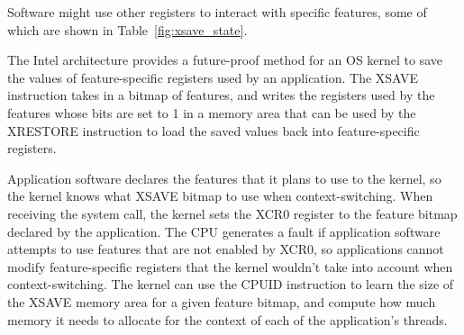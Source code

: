 Software might use other registers to interact with specific features, some of
which are shown in Table~\ref{fig:xsave_state}.

\begin{table}[hbt]
  \caption{Sample feature-specific Intel architecture registers.}
  \label{fig:xsave_state}
\end{table}

The Intel architecture provides a future-proof method for an OS kernel to save
the values of feature-specific registers used by an application. The XSAVE
instruction takes in a bitmap of features, and writes the registers used by
the features whose bits are set to 1 in a memory area that can be used by the
XRESTORE instruction to load the saved values back into feature-specific
registers.

Application software declares the features that it plans to use to the kernel,
so the kernel knows what XSAVE bitmap to use when context-switching. When
receiving the system call, the kernel sets the XCR0 register to the feature
bitmap declared by the application. The CPU generates a fault if application
software attempts to use features that are not enabled by XCR0, so applications
cannot modify feature-specific registers that the kernel wouldn't take into
account when context-switching. The kernel can use the CPUID instruction to
learn the size of the XSAVE memory area for a given feature bitmap, and compute
how much memory it needs to allocate for the context of each of the
application's threads.

